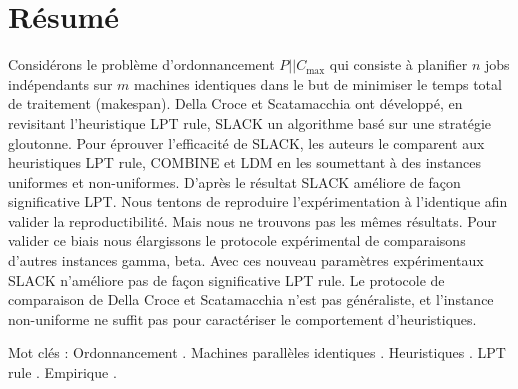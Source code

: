 \documentclass[a4paper,12pt]{report}
\theoremstyle{plain}				%
\theoremstyle{definition}				%
\newcommand\problemGrahamP{$P||C_{\max}$\xspace}
\newcommand\dcs{Della Croce et Scatamacchia\xspace}
\begin{document}
\section*{Résumé} \label{sec:resume}
Considérons le problème d'ordonnancement \problemGrahamP qui consiste à planifier $n$ jobs indépendants 
  sur $m$ machines identiques dans le but de minimiser le temps total de traitement (makespan). 
\dcs ont développé, en revisitant l'heuristique LPT rule, SLACK un algorithme basé sur une stratégie gloutonne. 
Pour éprouver l'efficacité de SLACK, les auteurs le comparent aux heuristiques LPT rule, COMBINE et LDM en les soumettant à des instances uniformes et non-uniformes. 
D'après le résultat SLACK améliore de façon significative LPT.
Nous tentons de reproduire l'expérimentation à l'identique afin valider la reproductibilité. 
Mais nous ne trouvons pas les mêmes résultats. 
Pour valider ce biais nous élargissons le protocole expérimental de comparaisons  
  d'autres instances gamma, beta. 
Avec ces nouveau paramètres expérimentaux SLACK n'améliore pas de façon significative LPT rule.
Le protocole de comparaison de \dcs n'est pas généraliste, et l'instance non-uniforme ne suffit pas pour caractériser le comportement d'heuristiques. 

Mot clés : Ordonnancement . Machines parallèles identiques . Heuristiques . LPT rule . Empirique .     
\end{document}
